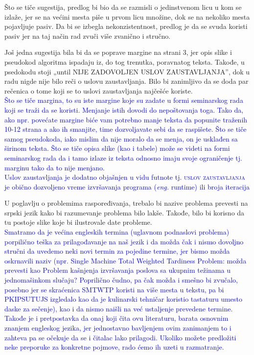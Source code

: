 \documentclass[a4paper]{report}
\newcommand{\odgovor}[1]{\textcolor{blue}{#1}}
\newcommand{\eng}[1]{(\textit{eng.} #1)}
\begin{document}
Što se tiče sugestija, predlog bi bio da se razmisli o jedinstvenom licu u kom se izlaže, jer se na većini mesta piše u prvom licu množine, dok se na nekoliko mesta pojavljuje pasiv. Da bi se izbegla nekonzistentnost, predlog je da se svuda koristi pasiv jer na taj način rad zvuči više zvanično i stručno. 

Još jedna sugestija bila bi da se poprave margine na strani 3, jer opis slike i pseudokod algoritma ispadaju iz, do tog trenutka, poravnatog teksta. Takođe, u psedokodu stoji „until NIJE ZADOVOLJEN USLOV ZAUSTAVLJANJA”, dok u radu nigde nije bilo reči o uslovu zaustavljanja. Bilo bi zanimljivo da se doda par rečenica o tome koji se to uslovi zaustavljanja najčešće koriste.\\
\odgovor{Što se tiče margina, to su iste margine koje su zadate u formi seminarskog rada koji se traži da se koristi. Menjanje istih dovodi do nepoštovanja toga. Tako da, ako npr. povećate margine biće vam potrebno manje teksta da popunite traženih 10-12 strana a ako ih smanjite, time dozvoljavate sebi da se raspišete. 
Što se tiče samog pseudokoda, iako mislim da nije moralo da se menja, on je usklađen sa širinom teksta. Što se tiče opisa slike (kao i tabele) može se videti na formi seminarskog rada da i tamo izlaze iz teksta odnosno imaju svoje ograničenje tj. marginu tako da to nije menjano.\\
Uslov zaustavljanja je dodatno objašnjen u vidu futnote tj. \textsc{uslov zaustavljanja} je obično dozvoljeno vreme izvršavanja programa \eng{runtime} ili broja iteracija\\}

U poglavlju o problemima raspoređivanja, trebalo bi nazive problema prevesti na srpski jezik kako bi razumevanje problema bilo lakše. Takođe, bilo bi korisno da tu postoje slike koje bi ilustrovale date probleme.\\
\odgovor{Smatramo da je većina engleskih termina (uglavnom podnaslovi problema) porpilično teška za prilagođavanje na naš jezik i da možda čak i nismo dovoljno stručni da uvedemo neki novi termin za pojedine termine, jer bismo možda oskrnavili naziv (npr. Single Machine Total Weighted Tardiness Problem: možda prevesti kao Problem kašnjenja izvršavanja poslova sa ukupnim težinama u jednomašinkom slučaju? Poprilično čudno, pa čak možda i smešno bi zvučalo, posebno jer se skraćenica SMTWTP koristi na više mesta u tekstu, pa bi PKIPSUTUJS izgledalo kao da je kulinarski tehničar koristio tastaturu umesto daske za sečenje), kao i da nismo naišli na već ustaljenje prevedene termine. Takođe je i pretpostavka da onaj koji čita ovu literaturu, barata osnovnim znanjem engleskog jezika, jer jednostavno bavljenjem ovim zanimanjem to i zahteva pa se očekuje da se i čitalac lako prilagodi. Ukoliko možete predložiti neke preporuke za konkretne pojmove, rado ćemo ih uzeti u razmatranje.\\}
\end{document}
